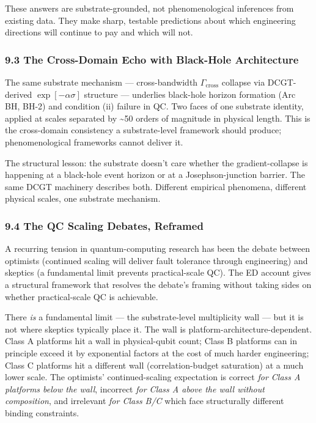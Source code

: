 \documentclass[
  11pt,
  a4paper,
]{article}
\begin{document}
These answers are substrate-grounded, not phenomenological inferences
from existing data. They make sharp, testable predictions about which
engineering directions will continue to pay and which will not.

\subsubsection{9.3 The Cross-Domain Echo with Black-Hole
Architecture}\label{the-cross-domain-echo-with-black-hole-architecture}

The same substrate mechanism --- cross-bandwidth
\(\Gamma_{\mathrm{cross}}\) collapse via DCGT-derived
\(\exp[-\alpha\sigma]\) structure --- underlies black-hole horizon
formation (Arc BH, BH-2) and condition (ii) failure in QC. Two faces of
one substrate identity, applied at scales separated by \textasciitilde50
orders of magnitude in physical length. This is the cross-domain
consistency a substrate-level framework should produce; phenomenological
frameworks cannot deliver it.

The structural lesson: the substrate doesn't care whether the
gradient-collapse is happening at a black-hole event horizon or at a
Josephson-junction barrier. The same DCGT machinery describes both.
Different empirical phenomena, different physical scales, one substrate
mechanism.

\subsubsection{9.4 The QC Scaling Debates,
Reframed}\label{the-qc-scaling-debates-reframed}

A recurring tension in quantum-computing research has been the debate
between optimists (continued scaling will deliver fault tolerance
through engineering) and skeptics (a fundamental limit prevents
practical-scale QC). The ED account gives a structural framework that
resolves the debate's framing without taking sides on whether
practical-scale QC is achievable.

There \emph{is} a fundamental limit --- the substrate-level multiplicity
wall --- but it is not where skeptics typically place it. The wall is
platform-architecture-dependent. Class A platforms hit a wall in
physical-qubit count; Class B platforms can in principle exceed it by
exponential factors at the cost of much harder engineering; Class C
platforms hit a different wall (correlation-budget saturation) at a much
lower scale. The optimists' continued-scaling expectation is correct
\emph{for Class A platforms below the wall}, incorrect \emph{for Class A
above the wall without composition}, and irrelevant \emph{for Class B/C}
which face structurally different binding constraints.
\end{document}
